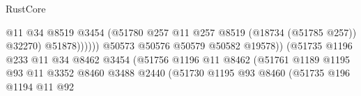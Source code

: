 \begin{lexlean}{RustCore}
\begin{coremodule}
                                                          @11
                                                          @34
                                                          @8519
                                                          @3454
                                                          (@51780
                                                            @257
                                                            @11
                                                            @257
                                                            @8519
                                                            (@18734 (@51785 @257))
                                                            @32270)
                                                          @51878))))))
                                              @50573
                                              @50576
                                              @50579
                                              @50582
                                              @19578))
                                          (@51735
                                            @1196
                                            @233
                                            @11
                                            @34
                                            @8462
                                            @3454
                                            (@51756
                                              @1196
                                              @11
                                              @8462
                                              (@51761
                                                @1189
                                                @1195
                                                @93
                                                @11
                                                @3352
                                                @8460
                                                @3488
                                                @2440
                                                (@51730
                                                  @1195
                                                  @93
                                                  @8460
                                                  (@51735
                                                    @196
                                                    @1194
                                                    @11
                                                    @92

\end{coremodule}
\end{lexlean}
